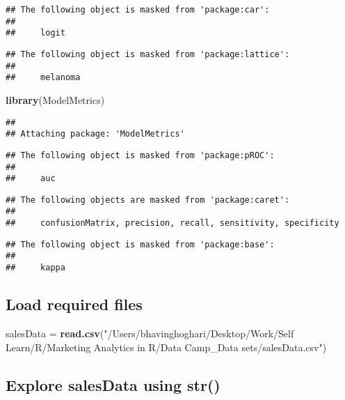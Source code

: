 \documentclass[
]{article}
\newenvironment{Shaded}{\begin{snugshade}}{\end{snugshade}}
\newcommand{\KeywordTok}[1]{\textcolor[rgb]{0.13,0.29,0.53}{\textbf{#1}}}
\newcommand{\NormalTok}[1]{#1}
\newcommand{\StringTok}[1]{\textcolor[rgb]{0.31,0.60,0.02}{#1}}
\begin{document}
\begin{verbatim}
## The following object is masked from 'package:car':
## 
##     logit
\end{verbatim}

\begin{verbatim}
## The following object is masked from 'package:lattice':
## 
##     melanoma
\end{verbatim}

\begin{Shaded}
\begin{Highlighting}[]
\KeywordTok{library}\NormalTok{(ModelMetrics)}
\end{Highlighting}
\end{Shaded}

\begin{verbatim}
## 
## Attaching package: 'ModelMetrics'
\end{verbatim}

\begin{verbatim}
## The following object is masked from 'package:pROC':
## 
##     auc
\end{verbatim}

\begin{verbatim}
## The following objects are masked from 'package:caret':
## 
##     confusionMatrix, precision, recall, sensitivity, specificity
\end{verbatim}

\begin{verbatim}
## The following object is masked from 'package:base':
## 
##     kappa
\end{verbatim}

\hypertarget{load-required-files}{%
\subsection{Load required files}\label{load-required-files}}

\begin{Shaded}
\begin{Highlighting}[]
\NormalTok{salesData =}\StringTok{ }\KeywordTok{read.csv}\NormalTok{(}\StringTok{"/Users/bhavinghoghari/Desktop/Work/Self Learn/R/Marketing Analytics in R/Data Camp_Data sets/salesData.csv"}\NormalTok{)}
\end{Highlighting}
\end{Shaded}

\hypertarget{explore-salesdata-using-str}{%
\subsection{Explore salesData using
str()}\label{explore-salesdata-using-str}}
\end{document}
